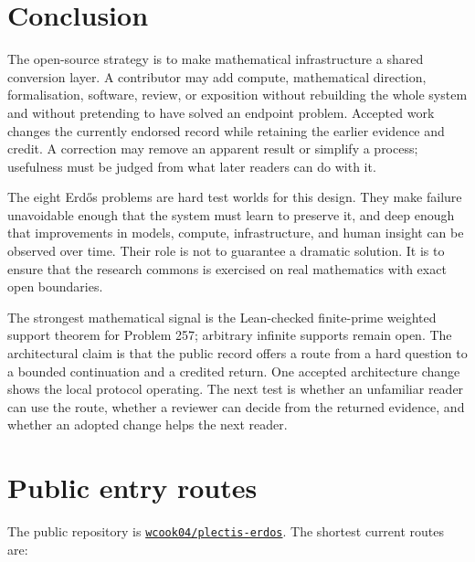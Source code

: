 \documentclass[10pt]{article}
\newcommand{\repobase}{https://github.com/wcook04/plectis-erdos}
\begin{document}
\section{Conclusion}\label{sec:conclusion}

The open-source strategy is to make mathematical infrastructure a shared
conversion layer.  A contributor may add compute, mathematical direction,
formalisation, software, review, or exposition without rebuilding the whole
system and without pretending to have solved an endpoint problem. Accepted
work changes the currently endorsed record while retaining the earlier
evidence and credit. A correction may remove an apparent result or simplify
a process; usefulness must be judged from what later readers can do with it.

The eight Erd\H{o}s problems are hard test worlds for this design.  They make
failure unavoidable enough that the system must learn to preserve it, and
deep enough that improvements in models, compute, infrastructure, and human
insight can be observed over time.  Their role is not to guarantee a dramatic
solution.  It is to ensure that the research commons is exercised on real
mathematics with exact open boundaries.

The strongest mathematical signal is the Lean-checked finite-prime weighted
support theorem for Problem 257; arbitrary infinite supports remain open.
The architectural claim is that the public record offers a route from a hard
question to a bounded continuation and a credited return. One accepted
architecture change shows the local protocol operating. The next test is
whether an unfamiliar reader can use the route, whether a reviewer can decide
from the returned evidence, and whether an adopted change helps the next
reader.

\appendix
\section{Public entry routes}\label{app:routes}

The public repository is \href{\repobase}{\texttt{wcook04/plectis-erdos}}.
The shortest current routes are:
\end{document}
